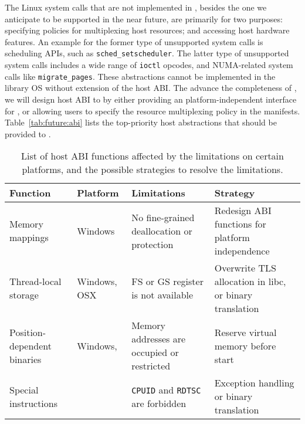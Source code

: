 The Linux system calls that are not implemented in \graphene{},
besides the one we anticipate to be supported in the near future,
are primarily for two purposes:
specifying policies for multiplexing host resources;
and accessing host hardware features.
An example for the former type of unsupported system calls is scheduling APIs, such as {\tt sched\_setscheduler}.
The latter type of unsupported system calls includes
a wide range of {\tt ioctl} opcodes,
and NUMA-related system calls like {\tt migrate\_pages}.
These abstractions cannot be implemented in the library OS
without extension of the host ABI.
The advance the completeness of \graphene{},
we will design host ABI to by
either providing an platform-independent interface
for \picoprocs{},
or allowing users to specify the resource multiplexing policy in the manifests.
Table~\ref{tab:future:abi} lists the top-priority host abstractions
that should be provided to \picoprocs{}.


\begin{table}[t]
\footnotesize
\centering
\begin{tabular}{|p{1.2in}|>{\raggedright\arraybackslash}p{0.8in}|>{\raggedright\arraybackslash}p{1.6in}|>{\raggedright\arraybackslash}p{2.2in}|}
\hline
{\bf Function} & {\bf Platform} & {\bf Limitations} & {\bf Strategy} \\
\hline
Memory mappings & Windows & No fine-grained deallocation or protection & Redesign ABI functions for platform independence \\
\hline
Thread-local storage & Windows, OSX & FS or GS register is not available & Overwrite TLS allocation in libc, or binary translation \\
\hline
Position-dependent binaries & Windows, \intel{} \sgx{} & Memory addresses are occupied or restricted & Reserve virtual memory before \picoprocs{} start \\
\hline
Special instructions & \intel{} \sgx{} & {\tt CPUID} and {\tt RDTSC} are forbidden & Exception handling or binary translation \\
\hline
\end{tabular}
\caption[List of host ABI limitations on certian platforms]
{List of host ABI functions affected by the limitations on certain platforms, and the possible strategies to resolve the limitations.}
\label{tab:future:abi-limit}
\end{table}


